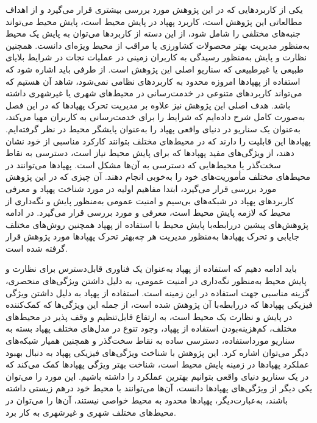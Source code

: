 یکی از کاربردهایی که در این پژوهش مورد بررسی بیشتری قرار می‌گیرد و از اهداف مطالعاتی این پژوهش است، کاربرد پهپاد در پایش محیط است، پایش محیط می‌تواند جنبه‌های مختلفی را شامل شود، از این دسته از کاربردها می‌توان به پایش یک محیط به‌منظور مدیریت بهتر محصولات کشاورزی یا مراقب از محیط ویژه‌ای دانست. همچنین نظارت و پایش به‌منظور رسیدگی به کاربران زمینی در عملیات نجات در شرایط بلایای طبیعی یا غیرطبیعی که سناریو اصلی این پژوهش است. از طرفی باید اشاره شود که استفاده از پهپادها امروزه محدود به کاربردهای نظامی نمی‌شود، شاهد آن هستیم که می‌تواند کاربردهای متنوعی در خدمت‌رسانی در محیط‌های شهری یا غیرشهری داشته باشد. هدف اصلی این پژوهش نیز علاوه بر مدیریت تحرک پهپادها که در این فصل به‌صورت کامل شرح داده‌ایم که شرایط را برای خدمت‌رسانی به کاربران مهیا می‌کند، به‌عنوان یک سناریو در دنیای واقعی پهپاد را به‌عنوان پایشگر محیط در نظر گرفته‌ایم. پهپادها این قابلیت را دارند که در محیط‌های مختلف بتوانند کارکرد مناسبی از خود نشان دهند، از ویژگی‌های مفید پهپادها که برای پایش محیط نیاز است، دسترسی به نقاط سخت‌گذر یا محیط‌هایی که دسترسی به آن‌ها مشکل است. پهپادها می‌توانند در محیط‌های مختلف مأموریت‌های خود را به‌خوبی انجام دهند. آن چیزی که در این پژوهش مورد بررسی قرار می‌گیرد، ابتدا مفاهیم اولیه در مورد شناخت پهپاد و معرفی کاربردهای پهپاد در شبکه‌های بی‌سیم و امنیت عمومی به‌منظور پایش و نگه‌داری از محیط که لازمه پایش محیط است، معرفی و مورد بررسی قرار می‌گیرد. در ادامه پژوهش‌های پیشین دررابطه‌با پایش محیط با استفاده از پهپاد همچنین روش‌های مختلف جایابی و تحرک پهپادها به‌منظور مدیریت هر چه‌بهتر تحرک پهپادها مورد پژوهش قرار گرفته شده است.

باید ادامه دهیم که استفاده از پهپاد به‌عنوان یک فناوری قابل‌دسترس برای نظارت و پایش محیط به‌منظور نگه‌داری در امنیت عمومی، به دلیل داشتن ویژگی‌های منحصری، گزینه مناسبی جهت استفاده در این زمینه است. استفاده از پهپاد به دلیل داشتن ویژگی فیزیکی پهپادها که دررابطه‌با آن پژوهش شده است، از جمله این ویژگی‌ها که کمک‌کننده در پایش و نظارت یک محیط است، به ارتفاع قابل‌تنظیم و وقف پذیر در محیط‌های مختلف، کم‌هزینه‌بودن استفاده از پهپاد، وجود تنوع در مدل‌های مختلف پهپاد بسته به سناریو مورداستفاده، دسترسی ساده به نقاط سخت‌گذر و همچنین همیار شبکه‌های دیگر می‌توان اشاره کرد. این پژوهش با شناخت ویژگی‌های فیزیکی پهپاد به دنبال بهبود عملکرد پهپادها در زمینه پایش محیط است، شناخت بهتر ویژگی پهپادها کمک می‌کند که در یک سناریو دنیای واقعی بتوانیم بهترین عملکرد را داشته باشیم.
این مورد را می‌توان یکی دیگر از ویژگی‌های پهپادها دانست، آن‌ها می‌توانند با محیط خود درهم زیستی داشته باشند، به‌عبارت‌دیگر، پهپادها محدود به محیط خواصی نیستند، آن‌ها را می‌توان در محیط‌های مختلف شهری و غیرشهری به کار برد.


